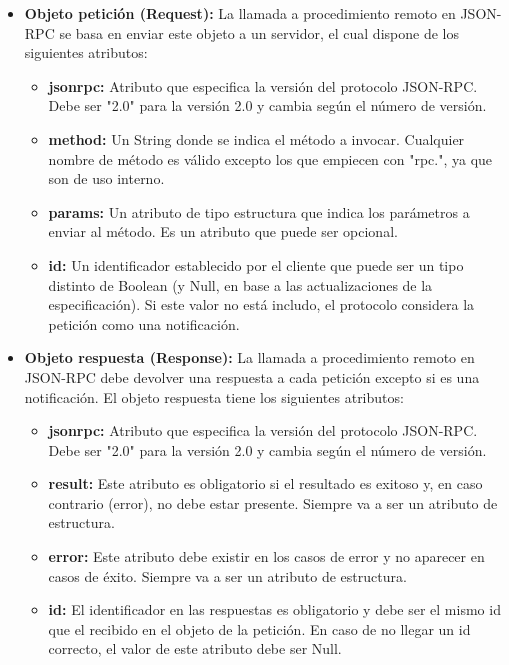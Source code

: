 \documentclass[spanish,12pt, a4paper, twoside]{paper}
\begin{document}
\begin{itemize}
\item \textbf{Objeto petición (Request):} La llamada a procedimiento remoto en JSON-RPC se basa en enviar este objeto a un servidor, el cual dispone de los siguientes atributos:

\begin{itemize}
\item \textbf{jsonrpc:} Atributo que especifica la versión del protocolo JSON-RPC. Debe ser "2.0" para la versión 2.0 y cambia según el número de versión.

\item \textbf{method:} Un String donde se indica el método a invocar. Cualquier nombre de método es válido excepto los que empiecen con "rpc.", ya que son de uso interno.

\item \textbf{params:} Un atributo de tipo estructura que indica los parámetros a enviar al método. Es un atributo que puede ser opcional.

\item \textbf{id:} Un identificador establecido por el cliente que puede ser un tipo distinto de Boolean (y Null, en base a las actualizaciones de la especificación). Si este valor no está includo, el protocolo considera la petición como una notificación.
\end{itemize}

\item \textbf{Objeto respuesta (Response):} La llamada a procedimiento remoto en JSON-RPC debe devolver una respuesta a cada petición excepto si es una notificación. El objeto respuesta tiene los siguientes atributos:

\begin{itemize}
\item \textbf{jsonrpc:} Atributo que especifica la versión del protocolo JSON-RPC. Debe ser "2.0" para la versión 2.0 y cambia según el número de versión.

\item \textbf{result:} Este atributo es obligatorio si el resultado es exitoso y, en caso contrario (error), no debe estar presente. Siempre va a ser un atributo de estructura.

\item \textbf{error:} Este atributo debe existir en los casos de error y no aparecer en casos de éxito. Siempre va a ser un atributo de estructura.

\item \textbf{id:} El identificador en las respuestas es obligatorio y debe ser el mismo id que el recibido en el objeto de la petición. En caso de no llegar un id correcto, el valor de este atributo debe ser Null.
\end{itemize}


\end{itemize}
\end{document}
